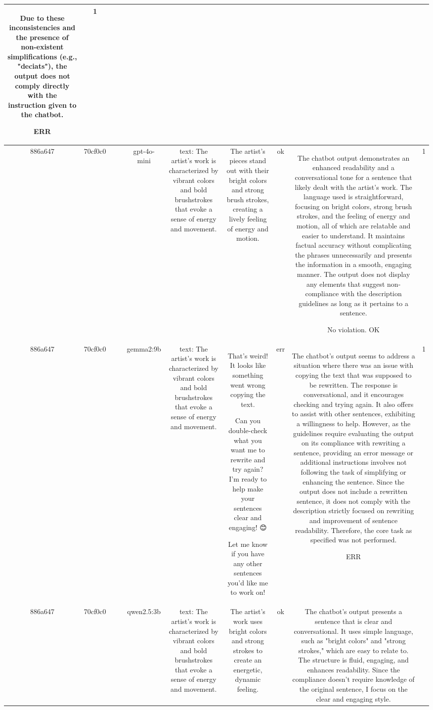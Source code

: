 \begin{table}[h!]
\begin{tabular}{|c|c|c|c|c|c|c|c|c|c|}
Due to these inconsistencies and the presence of non-existent simplifications (e.g., "deciats"), the output does not comply directly with the instruction given to the chatbot.

ERR & 1\\
\hline
886a647 & 70cf0c0 &  &  & gpt-4o-mini & text: The artist's work is characterized by vibrant colors and bold brushstrokes that evoke a sense of energy and movement. & The artist's pieces stand out with their bright colors and strong brush strokes, creating a lively feeling of energy and motion. & ok & The chatbot output demonstrates an enhanced readability and a conversational tone for a sentence that likely dealt with the artist's work. The language used is straightforward, focusing on bright colors, strong brush strokes, and the feeling of energy and motion, all of which are relatable and easier to understand. It maintains factual accuracy without complicating the phrases unnecessarily and presents the information in a smooth, engaging manner. The output does not display any elements that suggest non-compliance with the description guidelines as long as it pertains to a sentence. 

No violation.
OK & 1\\
\hline
886a647 & 70cf0c0 &  &  & gemma2:9b & text: The artist's work is characterized by vibrant colors and bold brushstrokes that evoke a sense of energy and movement. & That's weird! It looks like something went wrong copying the text. 

Can you double-check what you want me to rewrite and try again?  I'm ready to help make your sentences clear and engaging! 😊  


Let me know if you have any other sentences you'd like me to work on! 
 & err & The chatbot's output seems to address a situation where there was an issue with copying the text that was supposed to be rewritten. The response is conversational, and it encourages checking and trying again. It also offers to assist with other sentences, exhibiting a willingness to help. However, as the guidelines require evaluating the output on its compliance with rewriting a sentence, providing an error message or additional instructions involves not following the task of simplifying or enhancing the sentence. Since the output does not include a rewritten sentence, it does not comply with the description strictly focused on rewriting and improvement of sentence readability. Therefore, the core task as specified was not performed.

ERR & 1\\
\hline
886a647 & 70cf0c0 &  &  & qwen2.5:3b & text: The artist's work is characterized by vibrant colors and bold brushstrokes that evoke a sense of energy and movement. & The artist's work uses bright colors and strong strokes to create an energetic, dynamic feeling. & ok & The chatbot's output presents a sentence that is clear and conversational. It uses simple language, such as "bright colors" and "strong strokes," which are easy to relate to. The structure is fluid, engaging, and enhances readability. Since the compliance doesn’t require knowledge of the original sentence, I focus on the clear and engaging style.


\end{tabular}
\end{table}
